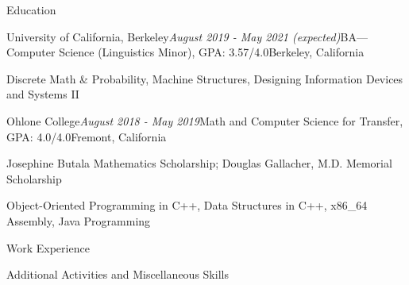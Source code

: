\documentclass{resume} %
\begin{document}

\begin{rSection}{Education}
\begin{rSubsection}{University of California, Berkeley}{\em August 2019 - May 2021 (expected)}{BA---Computer Science (Linguistics Minor), GPA: 3.57/4.0}{Berkeley, California}
\item Discrete Math \& Probability, Machine Structures, Designing Information Devices and Systems II
\end{rSubsection}
\begin{rSubsection}{Ohlone College}{\em August 2018 - May 2019}{Math and Computer Science for Transfer, GPA: 4.0/4.0}{Fremont, California}
\item Josephine Butala Mathematics Scholarship; Douglas Gallacher, M.D. Memorial Scholarship
\item Object-Oriented Programming in C++, Data Structures in C++, x86\_64 Assembly, Java Programming
\end{rSubsection}
\end{rSection}
\begin{rSection}{Work Experience}



%
\end{rSection}
\begin{rSection}{Additional Activities and Miscellaneous Skills}

\end{rSection}
\end{document}
